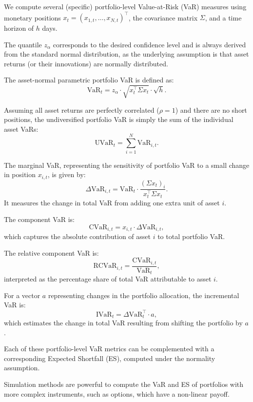 \documentclass[12pt]{article}
\begin{document}
\vspace{0.6em}

We compute several (specific) portfolio-level Value-at-Risk (VaR) measures using monetary positions $x_t = (x_{1,t}, \dots, x_{N,t})^\top$, the covariance matrix $\Sigma$, and a time horizon of $h$ days. 

The quantile $z_\alpha$ corresponds to the desired confidence level and is always derived from the standard normal distribution, as the underlying assumption is that asset returns (or their innovations) are normally distributed.

The asset-normal parametric portfolio VaR is defined as:
\[
  \text{VaR}_t = z_\alpha \cdot \sqrt{x_t^\top \Sigma x_t} \cdot \sqrt{h}.
\]

Assuming all asset returns are perfectly correlated ($\rho = 1$) and there are no short positions, the undiversified portfolio VaR is simply the sum of the individual asset VaRs:
\[
  \text{UVaR}_t = \sum_{i=1}^N \text{VaR}_{i,t}.
\]

The marginal VaR, representing the sensitivity of portfolio VaR to a small change in position $x_{i,t}$, is given by:
\[
  \Delta \text{VaR}_{i,t} = \text{VaR}_t \cdot \frac{(\Sigma x_t)_i}{x_t^\top \Sigma x_t}.
\]
It measures the change in total VaR from adding one extra unit of asset $i$.

The component VaR is:
\[
  \text{CVaR}_{i,t} = x_{i,t} \cdot \Delta \text{VaR}_{i,t},
\]
which captures the absolute contribution of asset $i$ to total portfolio VaR.

The relative component VaR is:
\[
  \text{RCVaR}_{i,t} = \frac{\text{CVaR}_{i,t}}{\text{VaR}_t},
\]
interpreted as the percentage share of total VaR attributable to asset $i$.

For a vector $a$ representing changes in the portfolio allocation, the incremental VaR is:
\[
  \text{IVaR}_t = \Delta \text{VaR}_t^\top \cdot a,
\]
which estimates the change in total VaR resulting from shifting the portfolio by $a$.

Each of these portfolio-level VaR metrics can be complemented with a corresponding Expected Shortfall (ES), computed under the normality assumption.



\vspace{0.6em}

\vspace{1em}
\underline{}

Simulation methods are powerful to compute the VaR and ES of portfolios with more complex instruments, such as options, which have a non-linear payoff. 
\end{document}
